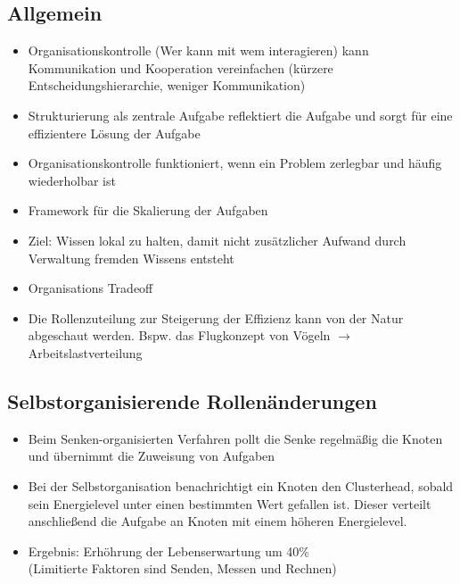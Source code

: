 \documentclass{article} %
\begin{document}
	\subsection{Allgemein}
	\begin{itemize}
		\item Organisationskontrolle (Wer kann mit wem interagieren) kann Kommunikation und Kooperation vereinfachen (kürzere Entscheidungshierarchie, weniger Kommunikation)
		\item Strukturierung als zentrale Aufgabe reflektiert die Aufgabe und sorgt für eine effizientere Lösung der Aufgabe
		\item Organisationskontrolle funktioniert, wenn ein Problem zerlegbar und häufig wiederholbar ist
		\item Framework für die Skalierung der Aufgaben
		\item Ziel: Wissen lokal zu halten, damit nicht zusätzlicher Aufwand durch Verwaltung fremden Wissens entsteht
		\item Organisations Tradeoff
		\item Die Rollenzuteilung zur Steigerung der Effizienz kann von der Natur abgeschaut werden. Bspw. das Flugkonzept von Vögeln $\rightarrow$ Arbeitslastverteilung
	\end{itemize}
	\subsection{Selbstorganisierende Rollenänderungen}
		\begin{itemize}
		\item Beim Senken-organisierten Verfahren pollt die Senke regelmäßig die Knoten und übernimmt die Zuweisung von Aufgaben
		\item Bei der Selbstorganisation benachrichtigt ein Knoten den Clusterhead, sobald sein Energielevel unter einen bestimmten Wert gefallen ist. Dieser verteilt anschließend die Aufgabe an Knoten mit einem höheren Energielevel.
		\item Ergebnis: Erhöhrung der Lebenserwartung um 40\%\\
		(Limitierte Faktoren sind Senden, Messen und Rechnen)
			\end{itemize}
\end{document}
